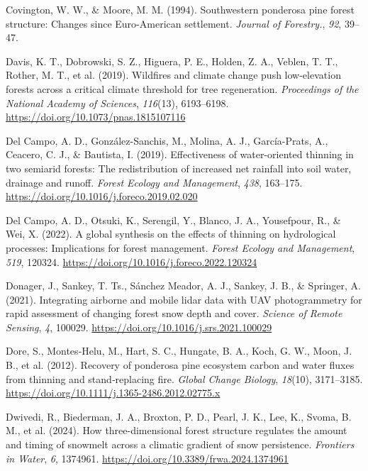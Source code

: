 \documentclass[
]{agujournal2019}
\newlength{\cslhangindent}
\newenvironment{CSLReferences}[2] %
 {\begin{list}{}{%
  \setlength{\itemindent}{0pt}
  \setlength{\leftmargin}{0pt}
  \setlength{\parsep}{0pt}
  \ifodd #1
   \setlength{\leftmargin}{\cslhangindent}
   \setlength{\itemindent}{-1\cslhangindent}
  \fi
  \setlength{\itemsep}{#2\baselineskip}}}
 {\end{list}}
\begin{document}
\begin{CSLReferences}{1}{0}
Covington, W. W., \& Moore, M. M. (1994). Southwestern ponderosa pine
forest structure: Changes since {Euro}-{American} settlement.
\emph{Journal of Forestry.}, \emph{92}, 39--47.

Davis, K. T., Dobrowski, S. Z., Higuera, P. E., Holden, Z. A., Veblen,
T. T., Rother, M. T., et al. (2019). Wildfires and climate change push
low-elevation forests across a critical climate threshold for tree
regeneration. \emph{Proceedings of the National Academy of Sciences},
\emph{116}(13), 6193--6198.
\url{https://doi.org/10.1073/pnas.1815107116}

Del Campo, A. D., González-Sanchis, M., Molina, A. J., García-Prats, A.,
Ceacero, C. J., \& Bautista, I. (2019). Effectiveness of water-oriented
thinning in two semiarid forests: {The} redistribution of increased net
rainfall into soil water, drainage and runoff. \emph{Forest Ecology and
Management}, \emph{438}, 163--175.
\url{https://doi.org/10.1016/j.foreco.2019.02.020}

Del Campo, A. D., Otsuki, K., Serengil, Y., Blanco, J. A., Yousefpour,
R., \& Wei, X. (2022). A global synthesis on the effects of thinning on
hydrological processes: {Implications} for forest management.
\emph{Forest Ecology and Management}, \emph{519}, 120324.
\url{https://doi.org/10.1016/j.foreco.2022.120324}

Donager, J., Sankey, T. Ts., Sánchez Meador, A. J., Sankey, J. B., \&
Springer, A. (2021). Integrating airborne and mobile lidar data with
{UAV} photogrammetry for rapid assessment of changing forest snow depth
and cover. \emph{Science of Remote Sensing}, \emph{4}, 100029.
\url{https://doi.org/10.1016/j.srs.2021.100029}

Dore, S., Montes‐Helu, M., Hart, S. C., Hungate, B. A., Koch, G. W.,
Moon, J. B., et al. (2012). Recovery of ponderosa pine ecosystem carbon
and water fluxes from thinning and stand‐replacing fire. \emph{Global
Change Biology}, \emph{18}(10), 3171--3185.
\url{https://doi.org/10.1111/j.1365-2486.2012.02775.x}

Dwivedi, R., Biederman, J. A., Broxton, P. D., Pearl, J. K., Lee, K.,
Svoma, B. M., et al. (2024). How three-dimensional forest structure
regulates the amount and timing of snowmelt across a climatic gradient
of snow persistence. \emph{Frontiers in Water}, \emph{6}, 1374961.
\url{https://doi.org/10.3389/frwa.2024.1374961}


\end{CSLReferences}
\end{document}
